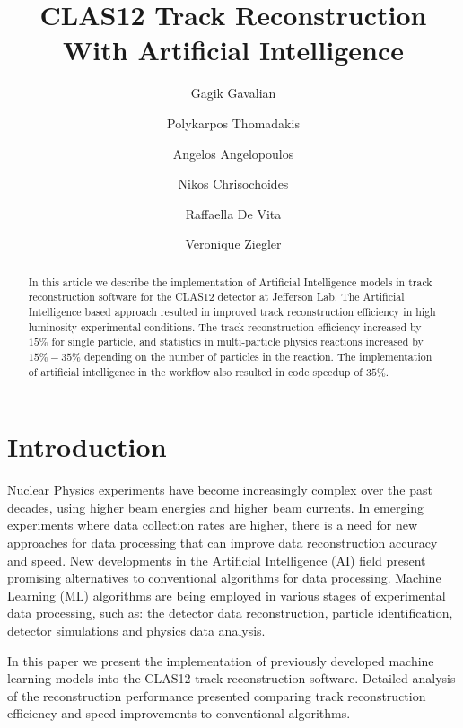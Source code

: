 \documentclass[preprint,12pt]{elsarticle}
\title{CLAS12 Track Reconstruction With Artificial Intelligence }
\author[1]{Gagik Gavalian}
\author[2]{Polykarpos Thomadakis}
\author[2]{Angelos Angelopoulos}
\author[2]{Nikos Chrisochoides}
\author[3]{Raffaella De Vita}
\author[1]{Veronique Ziegler}
\begin{document}
\begin{abstract}

  In this article we describe the implementation of Artificial Intelligence models in track reconstruction software for the CLAS12 detector at Jefferson Lab.
 The Artificial Intelligence based approach resulted in improved track reconstruction efficiency in high luminosity experimental conditions.  The track
 reconstruction efficiency increased by $15\%$ for single particle, and statistics in multi-particle physics reactions increased by $15\%-35\%$ depending 
 on the number of particles in the reaction. The implementation of artificial intelligence in the workflow also resulted in code speedup of $35\%$.
\end{abstract}
\maketitle


\section{Introduction}
\indent

Nuclear Physics experiments have become increasingly complex over the past decades, using higher beam energies and higher beam currents. In emerging experiments where data collection rates are higher, there is a need for new approaches for data processing that can improve data reconstruction accuracy and speed. New developments in the Artificial Intelligence (AI) field present promising alternatives to conventional algorithms for data processing. Machine Learning (ML) algorithms are being employed in various stages of experimental data processing, such as: the detector data reconstruction, particle identification, detector simulations and physics data analysis. 

In this paper we present the implementation of previously developed machine learning models into the CLAS12 track reconstruction software. Detailed analysis 
of the reconstruction performance presented comparing track reconstruction efficiency and speed improvements to conventional algorithms.









\end{document}
